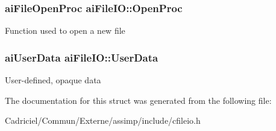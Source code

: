\subsubsection[{\texorpdfstring{Open\+Proc}{OpenProc}}]{\setlength{\rightskip}{0pt plus 5cm}ai\+File\+Open\+Proc ai\+File\+I\+O\+::\+Open\+Proc}\hypertarget{structai_file_i_o_a819d9c7823039294125068d06949a6df}{}\label{structai_file_i_o_a819d9c7823039294125068d06949a6df}
Function used to open a new file 
\subsubsection[{\texorpdfstring{User\+Data}{UserData}}]{\setlength{\rightskip}{0pt plus 5cm}ai\+User\+Data ai\+File\+I\+O\+::\+User\+Data}\hypertarget{structai_file_i_o_a9c62b7f3d70fbb2f41e33ad0b9933139}{}\label{structai_file_i_o_a9c62b7f3d70fbb2f41e33ad0b9933139}
User-\/defined, opaque data 

The documentation for this struct was generated from the following file\+:\begin{DoxyCompactItemize}
\item 
Cadriciel/\+Commun/\+Externe/assimp/include/cfileio.\+h\end{DoxyCompactItemize}
